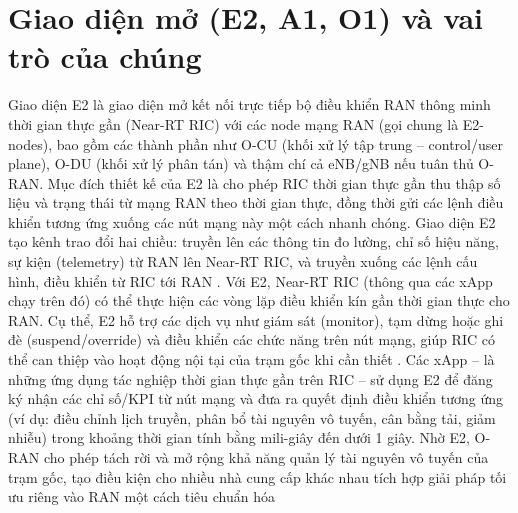 \section{Giao diện mở (E2, A1, O1) và vai trò của chúng}

Giao diện E2 là giao diện mở kết nối trực tiếp bộ điều khiển RAN thông minh thời gian thực gần (Near-RT RIC) với các node mạng RAN (gọi chung là E2-nodes), bao gồm các thành phần như O-CU (khối xử lý tập trung – control/user plane), O-DU (khối xử lý phân tán) và thậm chí cả eNB/gNB nếu tuân thủ O-RAN. Mục đích thiết kế của E2 là cho phép RIC thời gian thực gần thu thập số liệu và trạng thái từ mạng RAN theo thời gian thực, đồng thời gửi các lệnh điều khiển tương ứng xuống các nút mạng này một cách nhanh chóng. Giao diện E2 tạo kênh trao đổi hai chiều: truyền lên các thông tin đo lường, chỉ số hiệu năng, sự kiện (telemetry) từ RAN lên Near-RT RIC, và truyền xuống các lệnh cấu hình, điều khiển từ RIC tới RAN \cite{frontiers}. Với E2, Near-RT RIC (thông qua các xApp chạy trên đó) có thể thực hiện các vòng lặp điều khiển kín gần thời gian thực cho RAN. Cụ thể, E2 hỗ trợ các dịch vụ như giám sát (monitor), tạm dừng hoặc ghi đè (suspend/override) và điều khiển các chức năng trên nút mạng, giúp RIC có thể can thiệp vào hoạt động nội tại của trạm gốc khi cần thiết \cite{frontiers}. Các xApp – là những ứng dụng tác nghiệp thời gian thực gần trên RIC – sử dụng E2 để đăng ký nhận các chỉ số/KPI từ nút mạng và đưa ra quyết định điều khiển tương ứng (ví dụ: điều chỉnh lịch truyền, phân bổ tài nguyên vô tuyến, cân bằng tải, giảm nhiễu) trong khoảng thời gian tính bằng mili-giây đến dưới 1 giây. Nhờ E2, O-RAN cho phép tách rời và mở rộng khả năng quản lý tài nguyên vô tuyến của trạm gốc, tạo điều kiện cho nhiều nhà cung cấp khác nhau tích hợp giải pháp tối ưu riêng vào RAN một cách tiêu chuẩn hóa \cite{frontiers}


